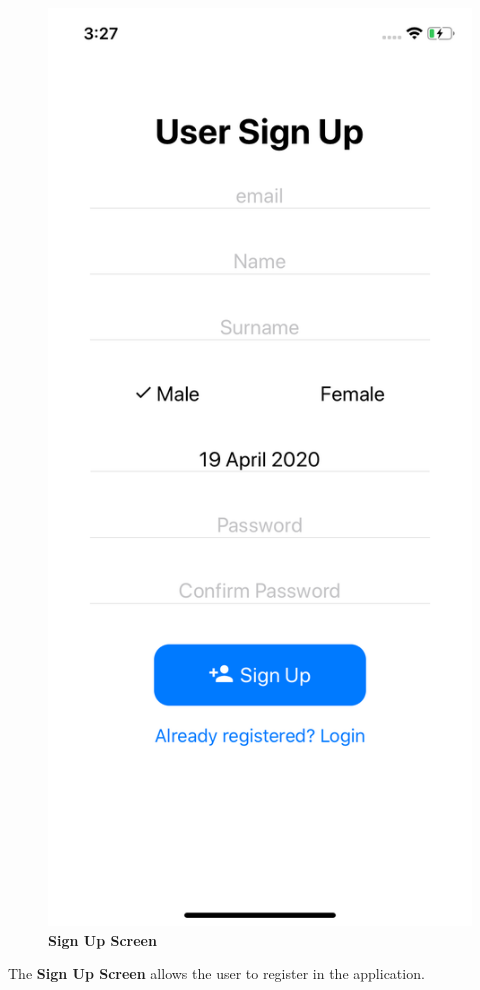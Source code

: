 \begin{figure}[H]
\centering
\includegraphics[height=.6\textheight]{./img/ui/signup.png}
\caption{\textbf{Sign Up Screen}}
\end{figure}
\begin{center}
The \textbf{Sign Up Screen} allows the user to register in the application.
\end{center}

